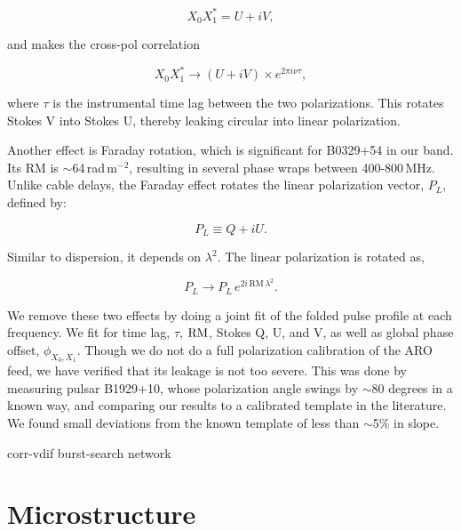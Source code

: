 \begin{equation}
X_0 X_1^* = U + iV,
\end{equation}

\noindent and makes the cross-pol correlation

\begin{equation}
X_0 X_1^* \rightarrow \left (U + iV \right) \times e^{2\pi i \nu \tau},
\end{equation}

\noindent where $\tau$ is the instrumental time lag
between the two polarizations. This rotates Stokes V 
into Stokes U, thereby leaking circular into linear polarization.

Another effect is Faraday rotation, which is significant 
for B0329+54 in our band. Its RM is $\sim$64\,rad\,m$^{-2}$, 
resulting in several phase wraps between 400-800\,MHz.
Unlike cable delays, the Faraday effect rotates the 
linear polarization vector, $P_L$, defined by:

\begin{equation}
P_L \equiv Q + iU.
\end{equation}

\noindent Similar to dispersion, it depends on $\lambda^2$.
The linear polarization is rotated as,

\begin{equation}
P_L \rightarrow P_L\, e^{2i\, \textrm{RM} \, \lambda^2}.
\end{equation}

We remove these two effects by doing a joint fit 
of the folded pulse profile at each frequency. We fit 
for time lag, $\tau$, $\rm RM$, Stokes 
Q, U, and V, as well as global phase offset, $\phi_{X_0,X_1}$. 
Though we do not do a full polarization calibration of 
the ARO feed, we have verified that its leakage is 
not too severe. This was done by measuring pulsar 
B1929+10, whose polarization angle swings by $\sim$80 
degrees in a known way, and comparing our results to a
calibrated template in the literature. We found 
small deviations from the known template of 
less than $\sim$5$\%$ in slope.

corr-vdif burst-search network

\section{Microstructure}

